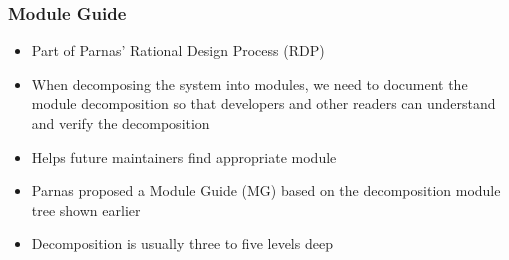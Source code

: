 \documentclass[t,12pt,numbers,fleqn]{beamer}
\begin{document}






\begin{frame}
\frametitle{Module Guide \cite{ParnasEtAl1984}}

\begin{itemize}
\item Part of Parnas' Rational Design Process (RDP)
\item When decomposing the system into modules, we need to document the module
  decomposition so that developers and other readers can understand and verify
  the decomposition
\item Helps future maintainers find appropriate module
\item Parnas proposed a Module Guide (MG) based on the decomposition module tree
  shown earlier
\item Decomposition is usually three to five levels deep
\end{itemize}

\end{frame}
\end{document}
